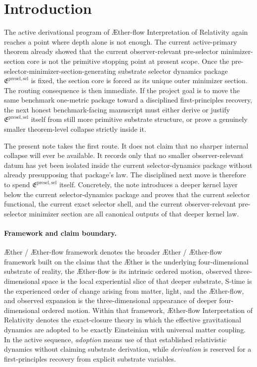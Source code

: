 \documentclass[11pt]{article}
\newcommand{\Aether}{\AE{}ther}
\newcommand{\Aflow}{\AE{}ther-flow}
\newcommand{\TheoryName}{\Aflow{} Interpretation of Relativity}
\newcommand{\TheoryProgram}{\Aether{} / \Aflow{} framework}
\newcommand{\PreSectionSelectorPackage}{\mathfrak E^{\mathrm{presel,sel}}}
\begin{document}
\section{Introduction}

The active derivational program of \TheoryName{} again reaches a point where depth alone is not enough. The current active-primary theorem already showed that the current observer-relevant pre-selector minimizer-section core is not the primitive stopping point at present scope. Once the pre-selector-minimizer-section-generating substrate selector dynamics package \(\PreSectionSelectorPackage\) is fixed, the section core is forced as its unique outer minimizer section. The routing consequence is then immediate. If the project goal is to move the same benchmark one-metric package toward a disciplined first-principles recovery, the next honest benchmark-facing manuscript must either derive or justify \(\PreSectionSelectorPackage\) itself from still more primitive substrate structure, or prove a genuinely smaller theorem-level collapse strictly inside it.

The present note takes the first route. It does not claim that no sharper internal collapse will ever be available. It records only that no smaller observer-relevant datum has yet been isolated inside the current selector-dynamics package without already presupposing that package's law. The disciplined next move is therefore to spend \(\PreSectionSelectorPackage\) itself. Concretely, the note introduces a deeper kernel layer below the current selector-dynamics package and proves that the current selector functional, the current exact selector shell, and the current observer-relevant pre-selector minimizer section are all canonical outputs of that deeper kernel law.

\paragraph{Framework and claim boundary.}
\TheoryProgram{} denotes the broader \Aether{} / \Aflow{} framework built on the claims that the \Aether{} is the underlying four-dimensional substrate of reality, the \Aflow{} is its intrinsic ordered motion, observed three-dimensional space is the local experiential slice of that deeper substrate, S-time is the experienced order of change arising from matter, light, and the \Aflow{}, and observed expansion is the three-dimensional appearance of deeper four-dimensional ordered motion. Within that framework, \TheoryName{} denotes the exact-closure theory in which the effective gravitational dynamics are adopted to be exactly Einsteinian with universal matter coupling. In the active sequence, \emph{adoption} means use of that established relativistic dynamics without claiming substrate derivation, while \emph{derivation} is reserved for a first-principles recovery from explicit substrate variables.
\end{document}
